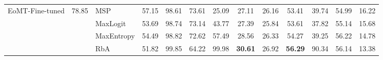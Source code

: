 \begin{table}[!t]
{\begin{tabular}{l|c|l|cc|cc|cc|cc|cc}
\midrule
EoMT-Fine-tuned & 78.85 & MSP        & 57.15 & 98.61 & 73.61 & 25.09 & 27.11          & 26.16 & 53.41          & 39.74 & 54.99 & 16.22 \\
                &       & MaxLogit   & 53.69 & 98.74 & 73.14 & 43.77 & 27.39          & 25.84 & 53.61          & 37.82 & 55.14 & 15.68 \\
                &       & MaxEntropy & 54.49 & 98.82 & 72.62 & 57.49 & 28.56          & 26.33 & 54.27          & 39.25 & 56.22 & 14.78 \\
                &       & RbA        & 51.82 & 99.85 & 64.22 & 99.98 & \textbf{30.61} & 26.92 & \textbf{56.29} & 90.34 & 56.14 & 13.38 \\
\bottomrule
\end{tabular}}
\end{table}
